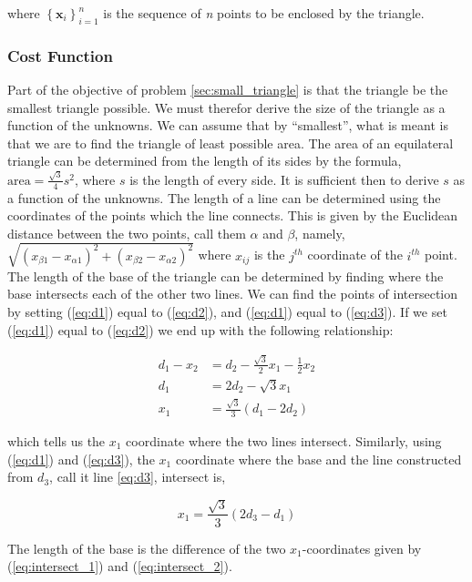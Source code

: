 \documentclass{article}
\begin{document}
\noindent where $\left\{ \mathbf{x}_i \right\}_{i=1}^n$ is the sequence of \textit{n} points to be enclosed by the triangle.

\subsubsection{Cost Function}

Part of the objective of problem \ref{sec:small_triangle} is that the triangle be the smallest triangle possible.
We must therefor derive the size of the triangle as a function of the unknowns.
We can assume that by ``smallest'', what is meant is that we are to find the triangle of least possible area.
The area of an equilateral triangle can be determined from the length of its sides by the formula, $\text{area} = \frac{\sqrt{3}}{4} s^2$, where $s$ is the length of every side.
It is sufficient then to derive $s$ as a function of the unknowns.
The length of a line can be determined using the coordinates of the points which the line connects.
This is given by the Euclidean distance between the two points, call them $\alpha$ and $\beta$, namely, $\sqrt{(x_{\beta 1} - x_{\alpha 1})^2 + (x_{\beta 2} - x_{\alpha 2})^2}$ where $x_{ij}$ is the $j^{th}$ coordinate of the $i^{th}$ point.
The length of the base of the triangle can be determined by finding where the base intersects each of the other two lines.
We can find the points of intersection by setting (\ref{eq:d1}) equal to (\ref{eq:d2}), and (\ref{eq:d1}) equal to (\ref{eq:d3}).
If we set (\ref{eq:d1}) equal to (\ref{eq:d2}) we end up with the following relationship:

\begin{align}
d_1 - x_2 &= d_2 - \frac{\sqrt{3}}{2} x_1 - \frac{1}{2} x_2\\
d_1 &= 2d_2 - \sqrt{3} x_1\\
\label{eq:intersect_1}
x_1 &= \frac{\sqrt{3}}{3}(d_1 - 2d_2) 
\end{align}

\noindent which tells us the $x_1$ coordinate where the two lines intersect.
Similarly, using (\ref{eq:d1}) and (\ref{eq:d3}), the $x_1$ coordinate where the base and the line constructed from $d_3$, call it line \ref{eq:d3}, intersect is,

\begin{equation} \label{eq:intersect_2}
x_1 = \frac{\sqrt{3}}{3}(2d_3 - d_1) 
\end{equation}

\noindent The length of the base is the difference of the two $x_1$-coordinates given by (\ref{eq:intersect_1}) and (\ref{eq:intersect_2}).
\end{document}
